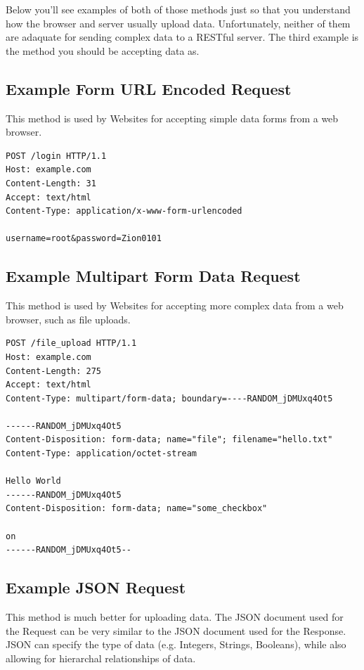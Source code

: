 \documentclass{book}
\begin{document}
Below you'll see examples of both of those methods just so that you understand how the browser and server usually upload data. Unfortunately, neither of them are adaquate for sending complex data to a RESTful server. The third example is the method you should be accepting data as.

\subsection{Example Form URL Encoded Request}

This method is used by Websites for accepting simple data forms from a web browser.

\begin{verbatim}
POST /login HTTP/1.1
Host: example.com
Content-Length: 31
Accept: text/html
Content-Type: application/x-www-form-urlencoded

username=root&password=Zion0101
\end{verbatim}

\subsection{Example Multipart Form Data Request}

This method is used by Websites for accepting more complex data from a web browser, such as file uploads.

\begin{verbatim}
POST /file_upload HTTP/1.1
Host: example.com
Content-Length: 275
Accept: text/html
Content-Type: multipart/form-data; boundary=----RANDOM_jDMUxq4Ot5

------RANDOM_jDMUxq4Ot5
Content-Disposition: form-data; name="file"; filename="hello.txt"
Content-Type: application/octet-stream

Hello World
------RANDOM_jDMUxq4Ot5
Content-Disposition: form-data; name="some_checkbox"

on
------RANDOM_jDMUxq4Ot5--
\end{verbatim}

\subsection{Example JSON Request}

This method is much better for uploading data. The JSON document used for the Request can be very similar to the JSON document used for the Response. JSON can specify the type of data (e.g. Integers, Strings, Booleans), while also allowing for hierarchal relationships of data.
\end{document}
